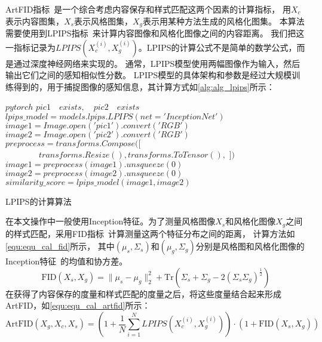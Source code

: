 \par ArtFID指标~\cite{wright2022artfid}是一个综合考虑内容保存和样式匹配这两个因素的计算指标，
用$X_c$表示内容图集，$X_s$表示风格图集，$X_g$表示用某种方法生成的风格化图集。
本算法需要使用到LPIPS指标~\cite{zhang2018unreasonable}来计算内容图像和风格化图像之间的内容距离。
我们把这一指标记录为\(LPIPS(X_c^{(i)},X_g^{(i)})\)。LPIPS的计算公式不是简单的数学公式，而是通过深度神经网络来实现的。
通常，LPIPS模型使用两幅图像作为输入，然后输出它们之间的感知相似性分数。
LPIPS模型的具体架构和参数是经过大规模训练得到的，用于捕捉图像的感知信息，其计算方式如\autoref{alg:alg_lpips}所示：
\begin{algorithm}[htb]
    \begin{algorithmic} %
        \REQUIRE $pytorch$
        \ENSURE $pic1 \quad exists, \quad pic2 \quad exists$
        \STATE $lpips\_model = models.lpips.LPIPS(net='InceptionNet')$
        \STATE $image1 = Image.open('pic1').convert('RGB')$
        \STATE $image2 = Image.open('pic2').convert('RGB')$
        \STATE $preprocess = transforms.Compose([$
        \STATE $\quad \quad \quad \quad transforms.Resize(),transforms.ToTensor(),$
        \STATE $])$
        \STATE $image1 = preprocess(image1).unsqueeze(0)$
        \STATE $image2 = preprocess(image2).unsqueeze(0)$
        \STATE $similarity\_score = lpips\_model(image1, image2)$
        
    \end{algorithmic}
    \caption{\label{alg:alg_lpips}LPIPS的计算算法}
\end{algorithm}
\par 在本文操作中一般使用Inception特征。为了测量风格图像$X_s$和风格化图像$X_g$之间的样式匹配，采用FID指标~\cite{heusel2017gans}计算测量这两个特征分布之间的距离，
计算方法如\autoref{equ:equ_cal_fid}所示，
其中\((\mu_s,\Sigma_s)\text{和}(\mu_g,\Sigma_g)\)分别是风格图和风格化图像的Inception特征~\cite{szegedy2016rethinking}的均值和协方差。
\begin{equation}
    \label{equ:equ_cal_fid}
    \mathrm{FID}(X_s,X_g)=\parallel\mu_s-\mu_g\parallel_2^2+\mathrm{Tr}(\Sigma_s+\Sigma_g-2(\Sigma_s\Sigma_g)^{\frac12})
\end{equation}
在获得了内容保存的度量和样式匹配的度量之后，将这些度量结合起来形成ArtFID，如\autoref{equ:equ_cal_artfid}所示：
\begin{equation}
    \label{equ:equ_cal_artfid}
    \mathrm{ArtFID}(X_g,X_c,X_s)=\left(1+\frac{1}{N}\sum_{i=1}^{N} LPIPS(X_c^{(i)},X_g^{(i)})\right)\cdot\left(1+\mathrm{FID}(X_s,X_g)\right)
\end{equation}

